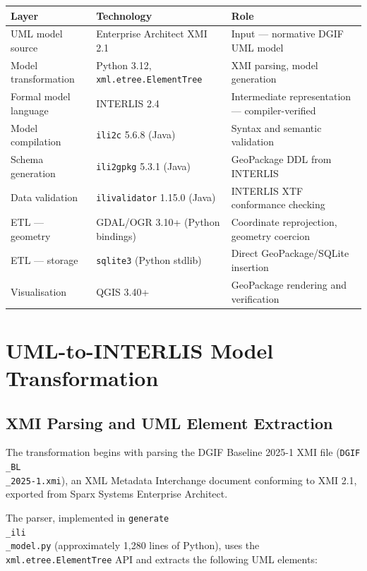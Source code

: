 \documentclass[conference]{IEEEtran}
\begin{document}
\begin{center}
\begin{longtable}{p{}p{}p{}}
Layer & Technology & Role \\
\midrule
UML model source & Enterprise Architect XMI 2.1 & Input — normative DGIF UML model \\
Model transformation & Python 3.12, \texttt{xml.etree.ElementTree} & XMI parsing, model generation \\
Formal model language & INTERLIS 2.4 & Intermediate representation — compiler-verified \\
Model compilation & \texttt{ili2c} 5.6.8 (Java) & Syntax and semantic validation \\
Schema generation & \texttt{ili2gpkg} 5.3.1 (Java) & GeoPackage DDL from INTERLIS \\
Data validation & \texttt{ilivalidator} 1.15.0 (Java) & INTERLIS XTF conformance checking \\
ETL — geometry & GDAL/OGR 3.10+ (Python bindings) & Coordinate reprojection, geometry coercion \\
ETL — storage & \texttt{sqlite3} (Python stdlib) & Direct GeoPackage/SQLite insertion \\
Visualisation & QGIS 3.40+ & GeoPackage rendering and verification \\
\end{longtable}
\end{center}




\section{UML-to-INTERLIS Model Transformation}

\subsection{XMI Parsing and UML Element Extraction}

The transformation begins with parsing the DGIF Baseline 2025-1 XMI file (\texttt{DGIF\\_BL\\_2025-1.xmi}), an XML Metadata Interchange document conforming to XMI 2.1, exported from Sparx Systems Enterprise Architect.

The parser, implemented in \texttt{generate\\_ili\\_model.py} (approximately 1,280 lines of Python), uses the \texttt{xml.etree.ElementTree} API and extracts the following UML elements:
\end{document}
